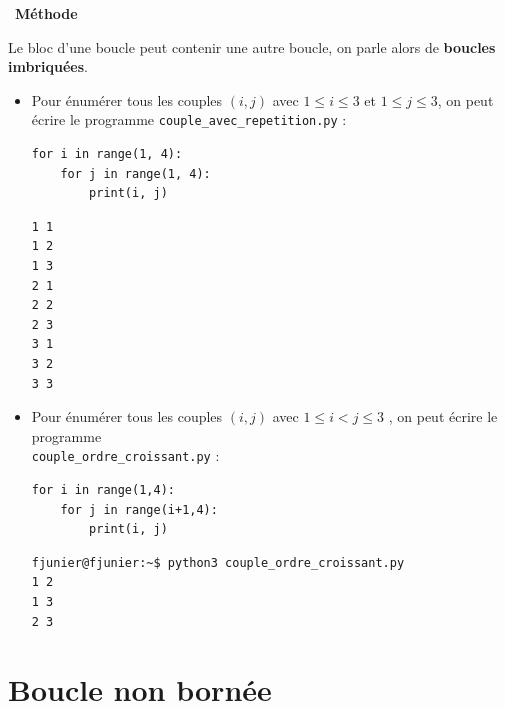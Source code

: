 \documentclass[a4paper, french, 12pt]{article}  %
\newcounter{prog}
\newenvironment{methode}[1]
{\par \medskip    \noindent  
 \begin {bclogo}[arrondi =0.1,logo=\bcoutil, marge=4,noborder = true] {~\textbf{Méthode}   {\itshape #1} }  \par}
{
\end{bclogo}
 \par \bigskip }
\begin{document}
\begin{methode}{}

Le bloc d'une boucle  peut contenir une autre boucle, on parle alors de \textbf{boucles imbriquées}.


\begin{itemize}

\item Pour énumérer tous les couples $(i, j)$ avec $1 \leqslant i \leqslant 3$ et $1 \leqslant j \leqslant 3$, on peut écrire le programme \texttt{couple\_avec\_repetition.py} :

\begin{minipage}{0.45\linewidth}
\begin{lstlisting}[style=rond]
for i in range(1, 4):
    for j in range(1, 4):
        print(i, j)
\end{lstlisting}
\end{minipage}\hfill
\begin{minipage}{0.6\linewidth}
\begin{lstlisting}[style=compil]
1 1
1 2
1 3
2 1
2 2
2 3
3 1
3 2
3 3
\end{lstlisting}
\end{minipage}

\item Pour énumérer tous les couples $(i, j)$ avec $1 \leqslant i < j \leqslant 3$ , on peut écrire le programme \\ \texttt{couple\_ordre\_croissant.py} :

\begin{minipage}{0.48\linewidth}
\begin{center}
\begin{lstlisting}[style=rond]
for i in range(1,4):
    for j in range(i+1,4):
        print(i, j)
\end{lstlisting}
\end{center}
\end{minipage}\hfill
\begin{minipage}{0.5\linewidth}
\begin{center}
\begin{lstlisting}[style=compil]
fjunier@fjunier:~$ python3 couple_ordre_croissant.py 
1 2
1 3
2 3
\end{lstlisting}
\end{center}
\end{minipage}
\end{itemize}

\end{methode}

\section{Boucle non bornée}
\end{document}
